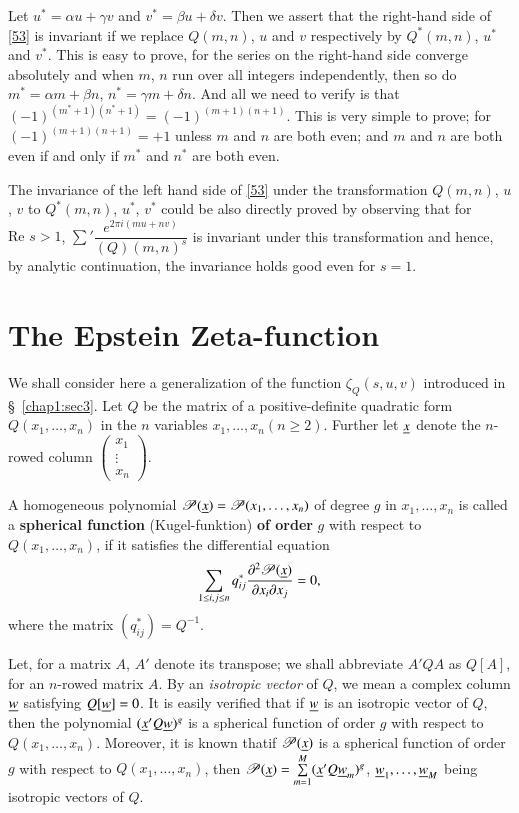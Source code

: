 Let $u^{\ast}=\alpha u+\gamma v$ and $v^{\ast}=\beta u+\delta v$. Then
we assert that the right-hand side of \eqref{53} is invariant if we
replace $Q(m,n)$, $u$ and $v$ respectively by\pageoriginale
$Q^{\ast}(m,n)$, $u^{\ast}$ and $v^{\ast}$. This is easy to prove, for
the series on the right-hand side converge absolutely and when $m$,
$n$ run over all integers independently, then so do $m^{\ast}=\alpha
m+\beta n$, $n^{\ast}=\gamma m+\delta n$. And all we need to verify is
that $(-1)^{(m^{\ast}+1)(n^{\ast}+1)}=(-1)^{(m+1)(n+1)}$. This is very
simple to prove; for $(-1)^{(m+1)(n+1)}=+1$ unless $m$ and $n$ are
both even; and $m$ and $n$ are both even if and only if $m^{\ast}$ and
$n^{\ast}$ are both even.

The invariance of the left hand side of \eqref{53} under the
transformation $Q(m,n)$, $u$, $v$ to $Q^{\ast}(m,n)$, $u^{\ast}$,
$v^{\ast}$ could be also directly proved by observing that for
$\text{Re } s>1$, $\sum'\dfrac{e^{2\pi i(mu+nv)}}{(Q)(m,n)^{s}}$ is
invariant under this transformation and hence, by analytic
continuation, the invariance holds good even for $s=1$.

\section{The Epstein Zeta-function}\label{chap1:sec5}

We shall consider here a generalization of the function
$\zeta_{Q}(s,u,v)$ introduced in \S\ \ref{chap1:sec3}. Let $Q$ be the matrix
of a positive-definite quadratic form $Q(x_{1},\ldots,x_{n})$ in the
$n$ variables $x_{1},\ldots,x_{n}(n\geq 2)$. Further let $\underline{x}$
denote the $n$-rowed column $\left(\begin{smallmatrix}
  x_{1}\\ \vdots\\ x_{n}\end{smallmatrix} \right)$.

A homogeneous polynomial
$\mathscr{P}(\underline{x})=\mathscr{P}(x_{1},\ldots,x_{n})$ of degree $g$ in
$x_{1},\ldots,x_{n}$ is called a {\bf spherical function}
(Kugel-funktion) {\bf of order} $g$ with respect to
$Q(x_{1},\ldots,x_{n})$, if it satisfies the differential equation
$$
\sum_{1\leq i,j\leq
  n}q^{\ast}_{ij}\frac{\partial^{2}\mathscr{P}(\underline{x})}{\partial
  x_{i}\partial x_{j}}=0,
$$
where the matrix $(q^{\ast}_{ij})=Q^{-1}$.

Let, for a matrix $A$, $A'$ denote its transpose; we shall abbreviate
$A'QA$ as $Q[A]$, for an $n$-rowed matrix $A$. By an {\em isotropic
  vector} of $Q$, we mean a complex column $\underline{w}$ satisfying
$Q[\underline{w}]=0$. It is easily verified that if $\underline{w}$ is an isotropic
vector of $Q$, then the polynomial $(\underline{x}'Q\underline{w})^{g}$ is a
spherical function of order $g$ with respect to
$Q(x_{1},\ldots,x_{n})$. Moreover, it is known that\pageoriginale if
$\mathscr{P}(\underline{x})$ is a spherical function of order $g$ with
respect to $Q(x_{1},\ldots,x_{n})$, then
$\mathscr{P}(\underline{x})=\sum\limits^{M}_{m=1}(\underline{x}'Q\underline{w}_{m})^{g}$,
$\underline{w}_{1},\ldots,\underline{w}_{M}$ being isotropic vectors of $Q$.

